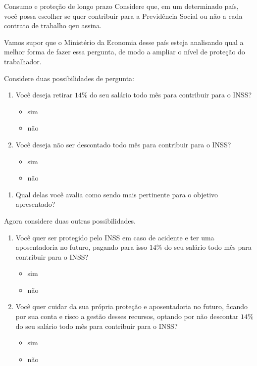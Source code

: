 \begin{task}{Consumo e proteção de longo prazo}
\label{fin-ativ-39}
Considere que, em um determinado país, você possa escolher se quer contribuir para a Previdência Social ou não a cada contrato de trabalho qeu assina.

Vamos supor que o Ministério da Economia desse país esteja analisando qual a melhor forma de fazer essa pergunta, de modo a ampliar o nível de proteção do trabalhador.

Considere duas possibilidades de pergunta:

\begin{enumerate}[label=\Roman*]
  \item Você deseja retirar $14$\% do seu salário todo mês para contribuir para o INSS?
  \begin{itemize}[label=(\hspace{1em})]
    \item sim
    \item não
  \end{itemize}
  \item Você deseja não ser descontado todo mês para contribuir para o INSS?
  \begin{itemize}[label=(\hspace{1em})]
    \item sim
    \item não
  \end{itemize}
\end{enumerate}

\begin{enumerate}
  \item Qual delas você avalia como sendo mais pertinente para o objetivo apresentado?
\end{enumerate}

Agora considere duas outras possibilidades.
\begin{enumerate}[label=\Roman*]
  \item Você quer ser protegido pelo INSS em caso de acidente e ter uma aposentadoria no futuro, pagando para isso $14$\% do seu salário todo mês para contribuir para o INSS?
  \begin{itemize}[label=(\hspace{1em})]
    \item sim
    \item não
  \end{itemize}
  \needspace{5em}
  \item Você quer cuidar da sua própria proteção e aposentadoria no futuro, ficando por sua conta e risco a gestão desses recursos, optando por não descontar $14$\% do seu salário todo mês para contribuir para o INSS?
  \begin{itemize}[label=(\hspace{1em})]
    \item sim
    \item não
  \end{itemize}
\end{enumerate}


\end{task}
